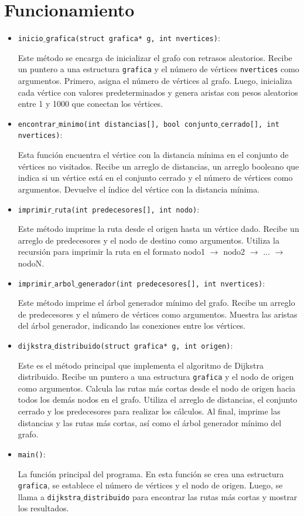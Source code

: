 \documentclass[a4paper,12pt]{article}
\begin{document}
\section*{Funcionamiento}

\begin{itemize}
    \item \texttt{inicio$\_$grafica(struct grafica* g, int nvertices)}:
    
    Este método se encarga de inicializar el grafo con retrasos aleatorios. Recibe un puntero a una estructura \texttt{grafica} y el número de vértices \texttt{nvertices} como argumentos. Primero, asigna el número de vértices al grafo. Luego, inicializa cada vértice con valores predeterminados y genera aristas con pesos aleatorios entre 1 y 1000 que conectan los vértices.

    \item \texttt{encontrar$\_$minimo(int distancias[], bool conjunto$\_$cerrado[], int nvertices)}: 
    
    Esta función encuentra el vértice con la distancia mínima en el conjunto de vértices no visitados. Recibe un arreglo de distancias, un arreglo booleano que indica si un vértice está en el conjunto cerrado y el número de vértices como argumentos. Devuelve el índice del vértice con la distancia mínima.

    \item \texttt{imprimir$\_$ruta(int predecesores[], int nodo)}:
    
    Este método imprime la ruta desde el origen hasta un vértice dado. Recibe un arreglo de predecesores y el nodo de destino como argumentos. Utiliza la recursión para imprimir la ruta en el formato nodo1 $\rightarrow$ nodo2 $\rightarrow$ ... $\rightarrow$ nodoN.

    \item \texttt{imprimir$\_$arbol$\_$generador(int predecesores[], int nvertices)}: 
    
    Este método imprime el árbol generador mínimo del grafo. Recibe un arreglo de predecesores y el número de vértices como argumentos. Muestra las aristas del árbol generador, indicando las conexiones entre los vértices.

    \item \texttt{dijkstra$\_$distribuido(struct grafica* g, int origen)}: 
    
    Este es el método principal que implementa el algoritmo de Dijkstra distribuido. Recibe un puntero a una estructura \texttt{grafica} y el nodo de origen como argumentos. Calcula las rutas más cortas desde el nodo de origen hacia todos los demás nodos en el grafo. Utiliza el arreglo de distancias, el conjunto cerrado y los predecesores para realizar los cálculos. Al final, imprime las distancias y las rutas más cortas, así como el árbol generador mínimo del grafo.

    \item \texttt{main()}: 
    
    La función principal del programa. En esta función se crea una estructura \texttt{grafica}, se establece el número de vértices y el nodo de origen. Luego, se llama a \texttt{dijkstra$\_$distribuido} para encontrar las rutas más cortas y mostrar los resultados.
\end{itemize}
\end{document}
